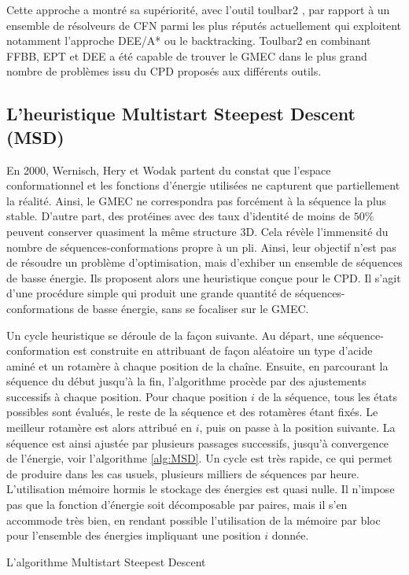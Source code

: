 Cette approche a montré sa supériorité, avec l'outil toulbar2 \cite{Allouche14,Traore13}, par rapport à un ensemble de résolveurs de CFN parmi les plus réputés actuellement qui exploitent notamment l'approche DEE/A* ou le backtracking. Toulbar2 en combinant FFBB, EPT et DEE a été capable de trouver le GMEC dans le plus grand nombre de problèmes issu du CPD proposés aux différents outils.
\subsection{L'heuristique Multistart Steepest Descent (MSD)}
\label{MSD}
En 2000, Wernisch, Hery et Wodak \cite{Wernisch00} partent du constat que l'espace conformationnel et les fonctions d'énergie utilisées ne capturent que partiellement la réalité. Ainsi, le GMEC ne correspondra pas forcément à la séquence la plus stable. D'autre part, des protéines avec des taux d'identité de moins de $50\%$ peuvent conserver quasiment la même structure 3D. Cela révèle l'immensité du nombre de séquences-conformations propre à un pli. Ainsi, leur objectif n'est pas de résoudre un problème d'optimisation, mais d'exhiber un ensemble de séquences de basse énergie. Ils proposent alors une heuristique conçue pour le CPD. Il s'agit d'une procédure simple qui produit une grande quantité de séquences-conformations de basse énergie, sans se focaliser sur le GMEC.

Un cycle heuristique se déroule de la façon suivante. Au départ, une séquence-conformation est construite en attribuant de façon aléatoire un type d'acide aminé et un rotamère à chaque position de la chaîne. Ensuite, en parcourant la séquence du début jusqu'à la fin, l'algorithme procède par des ajustements successifs à chaque position. Pour chaque position $i$ de la séquence, tous les états possibles sont évalués, le reste de la séquence et des rotamères étant fixés. Le meilleur rotamère est alors attribué en $i$, puis on passe à la position suivante. La séquence est ainsi ajustée par plusieurs passages successifs, jusqu'à convergence de l'énergie, voir l'algorithme \ref{alg:MSD}. Un cycle est très rapide, ce qui permet de produire dans les cas usuels, plusieurs milliers de séquences par heure. L'utilisation mémoire hormis le stockage des énergies est quasi nulle. Il n'impose pas que la fonction d'énergie soit décomposable par paires, mais il s'en accommode très bien, en rendant possible l'utilisation de la mémoire par bloc pour l'ensemble des énergies impliquant une position $i$ donnée.

\begin{algorithm}
  \caption{L'algorithme Multistart Steepest Descent}\label{alg:MSD}
\end{algorithm}


